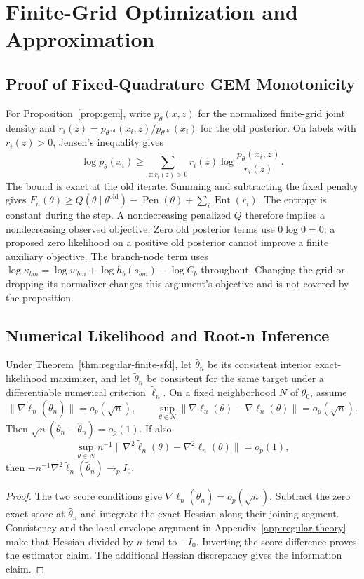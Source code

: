 \section{Finite-Grid Optimization and Approximation}
\label{app:numerical-theory}
\subsection{Proof of Fixed-Quadrature GEM Monotonicity}
For Proposition~\ref{prop:gem}, write $p_\theta(x,z)$ for the normalized
finite-grid joint density and $r_i(z)=p_{\theta^{\mathrm{old}}}(x_i,z)/
p_{\theta^{\mathrm{old}}}(x_i)$ for the old posterior. On labels with
$r_i(z)>0$, Jensen's inequality gives
\[
 \log p_\theta(x_i)\ge
  \sum_{z:r_i(z)>0}r_i(z)\log\frac{p_\theta(x_i,z)}{r_i(z)}.
\]
The bound is exact at the old iterate. Summing and subtracting the fixed
penalty gives $F_n(\theta)\ge Q(\theta\mid\theta^{\mathrm{old}})
-\operatorname{Pen}(\theta)+\sum_i\operatorname{Ent}(r_i)$.
The entropy is constant during the step. A nondecreasing penalized $Q$
therefore implies a nondecreasing observed objective. Zero old posterior
terms use $0\log0=0$; a proposed zero likelihood on a positive old posterior
cannot improve a finite auxiliary objective. The branch-node term uses
$\log\kappa_{bm}=\log w_{bm}+\log h_b(s_{bm})-\log C_b$ throughout.
Changing the grid or dropping its normalizer changes this argument's
objective and is not covered by the proposition.

\subsection{Numerical Likelihood and Root-n Inference}
\begin{proposition}
\label{prop:numerical-transfer}
Under Theorem~\ref{thm:regular-finite-sfd}, let $\hat\theta_n$ be its
consistent interior exact-likelihood maximizer, and let $\tilde\theta_n$
be consistent for the same target under a differentiable numerical criterion
$\tilde\ell_n$. On a fixed neighborhood $N$ of $\theta_0$, assume
\[
 \|\nabla\tilde\ell_n(\tilde\theta_n)\|=o_p(\sqrt n),\qquad
 \sup_{\theta\in N}\|\nabla\tilde\ell_n(\theta)
                           -\nabla\ell_n(\theta)\|=o_p(\sqrt n).
\]
Then $\sqrt n(\tilde\theta_n-\hat\theta_n)=o_p(1)$. If also
\[
 \sup_{\theta\in N}n^{-1}\|\nabla^2\tilde\ell_n(\theta)
                           -\nabla^2\ell_n(\theta)\|=o_p(1),
\]
then $-n^{-1}\nabla^2\tilde\ell_n(\tilde\theta_n)\to_p I_0$.
\end{proposition}
\begin{proof}
The two score conditions give $\nabla\ell_n(\tilde\theta_n)=o_p(\sqrt n)$.
Subtract the zero exact score at $\hat\theta_n$ and integrate the exact
Hessian along their joining segment. Consistency and the local envelope
argument in Appendix~\ref{app:regular-theory} make that Hessian divided by
$n$ tend to $-I_0$. Inverting the score difference proves the estimator
claim. The additional Hessian discrepancy gives the information claim.
\end{proof}

